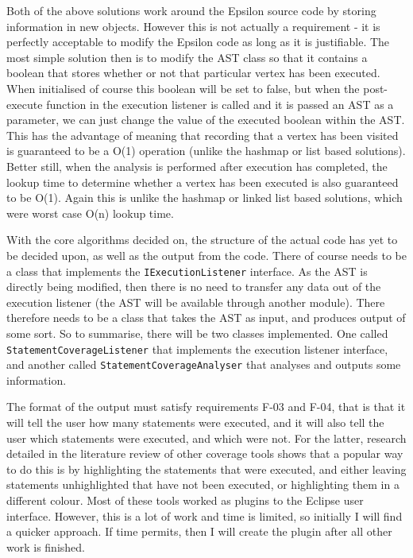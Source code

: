 Both of the above solutions work around the Epsilon source code by storing information in new objects. However this is not actually a requirement - it is perfectly acceptable to modify the Epsilon code as long as it is justifiable. The most simple solution then is to modify the AST class so that it contains a boolean that stores whether or not that particular vertex has been executed. When initialised of course this boolean will be set to false, but when the post-execute function in the execution listener is called and it is passed an AST as a parameter, we can just change the value of the executed boolean within the AST. This has the advantage of meaning that recording that a vertex has been visited is guaranteed to be a O(1) operation (unlike the hashmap or list based solutions). Better still, when the analysis is performed after execution has completed, the lookup time to determine whether a vertex has been executed is also guaranteed to be O(1). Again this is unlike the hashmap or linked list based solutions, which were worst case O(n) lookup time.

With the core algorithms decided on, the structure of the actual code has yet to be decided upon, as well as the output from the code. There of course needs to be a class that implements the \verb|IExecutionListener| interface. As the AST is directly being modified, then there is no need to transfer any data out of the execution listener (the AST will be available through another module). There therefore needs to be a class that takes the AST as input, and produces output of some sort. So to summarise, there will be two classes implemented. One called \verb|StatementCoverageListener| that implements the execution listener interface, and another called \verb|StatementCoverageAnalyser| that analyses and outputs some information.

The format of the output must satisfy requirements F-03 and F-04, that is that it will tell the user how many statements were executed, and it will also tell the user which statements were executed, and which were not. For the latter, research detailed in the literature review of other coverage tools shows that a popular way to do this is by highlighting the statements that were executed, and either leaving statements unhighlighted that have not been executed, or highlighting them in a different colour. Most of these tools worked as plugins to the Eclipse user interface. However, this is a lot of work and time is limited, so initially I will find a quicker approach. If time permits, then I will create the plugin after all other work is finished.

